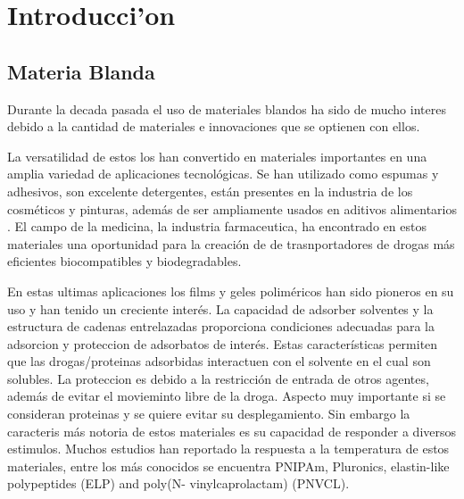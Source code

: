 
\chapter{Introducci'on}
\label{Chapter1} %


\section{Materia Blanda}

Durante la decada pasada el uso de materiales blandos ha sido de mucho interes debido a la cantidad de materiales e innovaciones que se optienen con ellos.

La versatilidad de estos los han convertido en materiales  importantes en una amplia variedad de aplicaciones tecnológicas.
Se han utilizado como  espumas y adhesivos, son excelente detergentes, est\'an presentes en la industria de los  cosméticos y pinturas, adem\'as de ser ampliamente usados en aditivos alimentarios . El campo de la medicina, la industria farmaceutica, ha encontrado en estos materiales una oportunidad para la creaci\'on de de trasnportadores de drogas m\'as eficientes biocompatibles y biodegradables.

En estas ultimas aplicaciones los  films y geles  polim\'ericos han sido pioneros en su uso y han tenido un creciente inter\'es.
La capacidad de adsorber solventes y la estructura de cadenas entrelazadas proporciona condiciones adecuadas para la adsorcion y proteccion de adsorbatos de interés. \addcite 
Estas características permiten que las drogas/proteinas adsorbidas interactuen con el solvente en el cual son solubles. La proteccion es debido a la restricción de entrada de otros agentes, además de evitar el movieminto libre de la droga. Aspecto muy importante si se consideran proteinas y se quiere evitar su desplegamiento.
Sin embargo la caracteris más notoria de estos materiales es su capacidad de responder a diversos estimulos. 
Muchos estudios han reportado la respuesta a la temperatura de estos materiales, entre los m\'as conocidos se encuentra PNIPAm, Pluronics, elastin-like polypeptides (ELP) and poly(N- vinylcaprolactam) (PNVCL).

